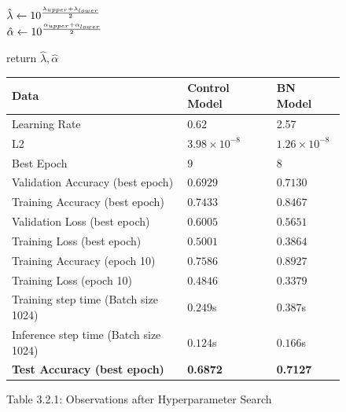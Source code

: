 \documentclass{article}
\begin{document}
\begin{figure}
\begin{minipage}{0.5\textwidth}
\begin{algorithm}[H]
{        }
    
        $\hat{\lambda} \leftarrow 10^{\lambda_{upper} + \lambda_{lower} \over 2}$\\
        $\hat{\alpha} \leftarrow 10^{\alpha_{upper} + \alpha_{lower} \over 2}$ 
    
        return $\hat{\lambda}, \hat{\alpha}$
        \end{algorithm}
    \end{minipage}
    
\end{figure}



\begin{figure}
    \captionsetup{labelformat=empty}
    \centering
    \caption{Table 3.2.1: Observations after Hyperparameter Search}
    \begin{tabular}{ |p{6cm}|p{3cm}|p{3cm}|  }
        \hline
        \textbf{Data} & \textbf{Control Model} & \textbf{BN Model}\\
        \hline
        \hline
        Learning Rate & $0.62$ & 2.57 \\ 
        L2 & $3.98 \times 10^{-8}$ & $1.26 \times 10^{-8}$\\
        Best Epoch & $9$ &$8$ \\
        \hline
        Validation Accuracy (best epoch) & $0.6929$ & $0.7130$\\
        Training Accuracy (best epoch) & $0.7433$ & $0.8467$\\
        Validation Loss (best epoch) & $0.6005$ & $0.5651$ \\
        Training Loss (best epoch) & $0.5001$ & $0.3864$\\
        \hline
        Training Accuracy (epoch 10) & $0.7586$ & $0.8927$\\
        Training Loss (epoch 10) & $0.4846$ & $0.3379$\\
        \hline
        Training step time (Batch size 1024) & $0.249$s & $0.387$s \\
        Inference step time (Batch size 1024) & $0.124$s & $0.166$s \\
        \hline
        \textbf{Test Accuracy (best epoch) }& \textbf{0.6872} & \textbf{0.7127} \\
        \hline
    \end{tabular}
\end{figure}
\end{document}
